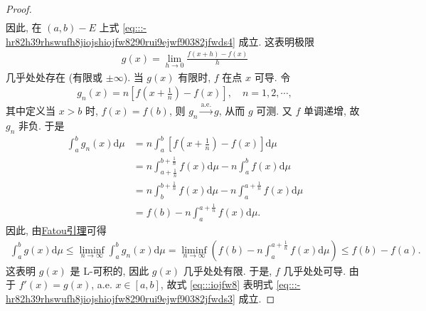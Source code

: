 \documentclass[../../main.tex]{subfiles}%
\begin{document}
\begin{proof}
\begin{align*}
\end{align*}
因此, 在 $(a,b)-E$ 上式 \eqref{eq:::-hr82h39rhswufh8jiojshiojfw8290rui9ejwf90382jfwds4} 成立. 这表明极限
\begin{align*}
g(x) = \lim_{h\to 0} \frac{f(x+h)-f(x)}{h}
\end{align*}
几乎处处存在 (有限或 $\pm\infty$). 当 $g(x)$ 有限时, $f$ 在点 $x$ 可导. 令
\begin{align*}
g_n(x) = n\left[f\!\left(x+\frac{1}{n}\right)-f(x)\right],\quad n=1,2,\cdots,
\end{align*}
其中定义当 $x>b$ 时, $f(x)=f(b)$, 则 $g_n\xrightarrow{\text{a.e.}} g$, 从而 $g$ 可测. 又 $f$ 单调递增, 故 $g_n$ 非负. 于是
\begin{align*}
\int_a^b g_n(x)\mathrm{d}\mu &= n\int_a^b \left[f\!\left(x+\frac{1}{n}\right)-f(x)\right]\mathrm{d}\mu \\
&= n\int_{a+\frac{1}{n}}^{b+\frac{1}{n}} f(x)\mathrm{d}\mu - n\int_a^b f(x)\mathrm{d}\mu \\
&= n\int_b^{b+\frac{1}{n}} f(x)\mathrm{d}\mu - n\int_a^{a+\frac{1}{n}} f(x)\mathrm{d}\mu \\
&= f(b)-n\int_a^{a+\frac{1}{n}} f(x)\mathrm{d}\mu.
\end{align*}
因此, 由\hyperref[theorem:Fatou引理]{Fatou引理}可得
\begin{align}
\int_a^b g(x)\mathrm{d}\mu \leqslant \liminf_{n\to\infty} \int_a^b g_n(x)\mathrm{d}\mu  = \liminf_{n\to\infty} \left(f(b)-n\int_a^{a+\frac{1}{n}} f(x)\mathrm{d}\mu\right) \leqslant f(b)-f(a). \label{eq:::iojfw8}
\end{align}
这表明 $g(x)$ 是 L-可积的, 因此 $g(x)$ 几乎处处有限. 于是, $f$ 几乎处处可导. 由于 $f'(x)=g(x)$, a.e. $x\in[a,b]$, 故式 \eqref{eq:::iojfw8} 表明式 \eqref{eq:::-hr82h39rhswufh8jiojshiojfw8290rui9ejwf90382jfwds3} 成立.

\end{proof}
\end{document}
